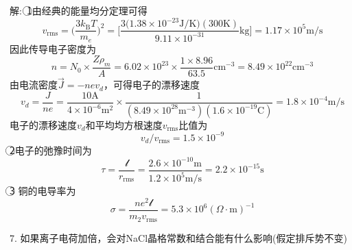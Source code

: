 解:~\textcircled{1}由经典的能量均分定理可得
\begin{displaymath}
	v_{\mathrm{rms}}=\bigg(\dfrac{3k_{\mathrm{B}}T}{m_e}\bigg)^2=\bigg[\dfrac{3\big(1.38\times10^{-23}\mathrm{J/K}\big)(300\mathrm{K})}{9.11\times10^{-31}}\mathrm{kg}\bigg]=1.17\times10^5\mathrm{m/s}
\end{displaymath} 
因此传导电子密度为
\begin{displaymath}
	n=N_0\times\dfrac{Z\rho_m}{A}=6.02\times10^{23}\times\dfrac{1\times8.96}{63.5}\mathrm{cm}^{-3}=8.49\times10^{22}\mathrm{cm}^{-3}
\end{displaymath} 
由电流密度$\vec J=-nev_d$，可得电子的漂移速度
\begin{displaymath}
	v_d=\dfrac{J}{ne}=\dfrac{10\mathrm{A}}{4\times10^{-6}\mathrm{m}^2}\times\dfrac1{(8.49\times10^{28}\mathrm{m}^{-3})(1.6\times10^{-19}\mathrm{C})}=1.8\times10^{-4}\mathrm{m/s}
\end{displaymath} 
电子的漂移速度$v_d$和平均均方根速度$v_{\mathrm{rms}}$比值为
\begin{displaymath}
	v_d/v_{\mathrm{rms}}=1.5\times10^{-9}
\end{displaymath}
\textcircled{2}电子的弛豫时间为
\begin{displaymath}
	\tau=\dfrac{\mathscr{l}}{r_{\mathrm{rms}}}=\dfrac{2.6\times10^{-10}\mathrm{m}}{1.2\times10^5\mathrm{m/s}}=2.2\times10^{-15}\mathrm{s}
\end{displaymath}
\textcircled{3}%
铜的电导率为
\begin{displaymath}
	\sigma=\dfrac{ne^2\mathscr{l}}{m_2v_{\mathrm{rms}}}=5.3\times10^6(\Omega\cdot\mathrm{m})^{-1}
\end{displaymath} 

7. 如果离子电荷加倍，会对\textrm{NaCl}晶格常数和结合能有什么影响(假定排斥势不变)

